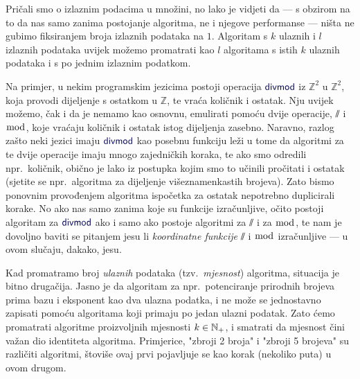 
\begin{napomena}\label{nap:brip}
Pričali smo o izlaznim podacima u množini, no lako je vidjeti da --- s obzirom na to da nas samo zanima postojanje algoritma, ne i njegove performanse --- ništa ne gubimo fiksiranjem broja izlaznih podataka na $1$. Algoritam s $k$ ulaznih i $l$ izlaznih podataka uvijek možemo promatrati kao $l$ algoritama s istih $k$ ulaznih podataka i s po jednim izlaznim podatkom.

Na primjer, u nekim programskim jezicima postoji operacija $\f{divmod}$ iz $\mathbb Z^2$ u $\mathbb Z^2$, koja provodi dijeljenje s ostatkom u $\mathbb Z$, te vraća količnik i ostatak. Nju uvijek možemo, čak i da je nemamo kao osnovnu, emulirati pomoću dvije operacije, $\sslash$ i $\bmod$, koje vraćaju količnik i ostatak istog dijeljenja zasebno. Naravno, razlog zašto neki jezici imaju $\f{divmod}$ kao posebnu funkciju leži u tome da algoritmi za te dvije operacije imaju mnogo zajedničkih koraka, te ako smo odredili npr.\ količnik, obično je lako iz postupka kojim smo to učinili pročitati i ostatak (sjetite se npr.\ algoritma za dijeljenje višeznamenkastih brojeva). Zato bismo ponovnim provođenjem algoritma ispočetka za ostatak nepotrebno duplicirali korake. No ako nas samo zanima koje su funkcije izračunljive, očito postoji algoritam za $\f{divmod}$ ako i samo ako postoje algoritmi za $\sslash$ i za $\bmod$, te nam je dovoljno baviti se pitanjem jesu li \emph{koordinatne funkcije} $\sslash$ i $\bmod$ izračunljive --- u ovom slučaju, dakako, jesu.
\end{napomena}

Kad promatramo broj \emph{ulaznih} podataka (tzv.\ \emph{mjesnost}) algoritma, situacija je bitno drugačija. Jasno je da algoritam za npr.\ potenciranje prirodnih brojeva prima bazu i eksponent kao dva ulazna podatka, i ne može se jednostavno zapisati pomoću algoritama koji primaju po jedan ulazni podatak. %
Zato ćemo promatrati algoritme proizvoljnih mjesnosti $k\in{\mathbb N}_+$, i smatrati da mjesnost čini važan dio identiteta algoritma. Primjerice, "zbroji 2 broja" i "zbroji 5 brojeva" su različiti algoritmi, štoviše ovaj prvi pojavljuje se kao korak (nekoliko puta) u ovom drugom.


